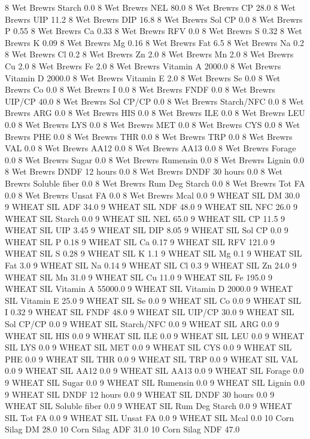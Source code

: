\documentclass[letterpaper,10pt,english]{sphinxmanual}
\begin{document}
\begin{sphinxVerbatim}[commandchars=\\\{\},numbers=left,firstnumber=1,stepnumber=1]
8 Wet Brewrs Starch 0.0
8 Wet Brewrs NEL 80.0
8 Wet Brewrs CP 28.0
8 Wet Brewrs UIP 11.2
8 Wet Brewrs DIP 16.8
8 Wet Brewrs Sol CP 0.0
8 Wet Brewrs P 0.55
8 Wet Brewrs Ca 0.33
8 Wet Brewrs RFV 0.0
8 Wet Brewrs S 0.32
8 Wet Brewrs K 0.09
8 Wet Brewrs Mg 0.16
8 Wet Brewrs Fat 6.5
8 Wet Brewrs Na 0.2
8 Wet Brewrs Cl 0.2
8 Wet Brewrs Zn 2.0
8 Wet Brewrs Mn 2.0
8 Wet Brewrs Cu 2.0
8 Wet Brewrs Fe 2.0
8 Wet Brewrs Vitamin A 2000.0
8 Wet Brewrs Vitamin D 2000.0
8 Wet Brewrs Vitamin E 2.0
8 Wet Brewrs Se 0.0
8 Wet Brewrs Co 0.0
8 Wet Brewrs I 0.0
8 Wet Brewrs FNDF 0.0
8 Wet Brewrs UIP/CP 40.0
8 Wet Brewrs Sol CP/CP 0.0
8 Wet Brewrs Starch/NFC 0.0
8 Wet Brewrs ARG 0.0
8 Wet Brewrs HIS 0.0
8 Wet Brewrs ILE 0.0
8 Wet Brewrs LEU 0.0
8 Wet Brewrs LYS 0.0
8 Wet Brewrs MET 0.0
8 Wet Brewrs CYS 0.0
8 Wet Brewrs PHE 0.0
8 Wet Brewrs THR 0.0
8 Wet Brewrs TRP 0.0
8 Wet Brewrs VAL 0.0
8 Wet Brewrs AA\PYGZsh{}12 0.0
8 Wet Brewrs AA\PYGZsh{}13 0.0
8 Wet Brewrs \PYGZpc{} Forage 0.0
8 Wet Brewrs Sugar \PYGZpc{} 0.0
8 Wet Brewrs Rumensin 0.0
8 Wet Brewrs Lignin 0.0
8 Wet Brewrs DNDF 12 hours 0.0
8 Wet Brewrs DNDF 30 hours 0.0
8 Wet Brewrs Soluble fiber 0.0
8 Wet Brewrs Rum Deg Starch 0.0
8 Wet Brewrs Tot FA 0.0
8 Wet Brewrs Unsat FA 0.0
8 Wet Brewrs Mcal 0.0
9 WHEAT SIL DM 30.0
9 WHEAT SIL ADF 34.0
9 WHEAT SIL NDF 48.0
9 WHEAT SIL NFC 26.0
9 WHEAT SIL Starch 0.0
9 WHEAT SIL NEL 65.0
9 WHEAT SIL CP 11.5
9 WHEAT SIL UIP 3.45
9 WHEAT SIL DIP 8.05
9 WHEAT SIL Sol CP 0.0
9 WHEAT SIL P 0.18
9 WHEAT SIL Ca 0.17
9 WHEAT SIL RFV 121.0
9 WHEAT SIL S 0.28
9 WHEAT SIL K 1.1
9 WHEAT SIL Mg 0.1
9 WHEAT SIL Fat 3.0
9 WHEAT SIL Na 0.14
9 WHEAT SIL Cl 0.3
9 WHEAT SIL Zn 24.0
9 WHEAT SIL Mn 31.0
9 WHEAT SIL Cu 11.0
9 WHEAT SIL Fe 195.0
9 WHEAT SIL Vitamin A 55000.0
9 WHEAT SIL Vitamin D 2000.0
9 WHEAT SIL Vitamin E 25.0
9 WHEAT SIL Se 0.0
9 WHEAT SIL Co 0.0
9 WHEAT SIL I 0.32
9 WHEAT SIL FNDF 48.0
9 WHEAT SIL UIP/CP 30.0
9 WHEAT SIL Sol CP/CP 0.0
9 WHEAT SIL Starch/NFC 0.0
9 WHEAT SIL ARG 0.0
9 WHEAT SIL HIS 0.0
9 WHEAT SIL ILE 0.0
9 WHEAT SIL LEU 0.0
9 WHEAT SIL LYS 0.0
9 WHEAT SIL MET 0.0
9 WHEAT SIL CYS 0.0
9 WHEAT SIL PHE 0.0
9 WHEAT SIL THR 0.0
9 WHEAT SIL TRP 0.0
9 WHEAT SIL VAL 0.0
9 WHEAT SIL AA\PYGZsh{}12 0.0
9 WHEAT SIL AA\PYGZsh{}13 0.0
9 WHEAT SIL \PYGZpc{} Forage 0.0
9 WHEAT SIL Sugar \PYGZpc{} 0.0
9 WHEAT SIL Rumensin 0.0
9 WHEAT SIL Lignin 0.0
9 WHEAT SIL DNDF 12 hours 0.0
9 WHEAT SIL DNDF 30 hours 0.0
9 WHEAT SIL Soluble fiber 0.0
9 WHEAT SIL Rum Deg Starch 0.0
9 WHEAT SIL Tot FA 0.0
9 WHEAT SIL Unsat FA 0.0
9 WHEAT SIL Mcal 0.0
10 Corn Silag DM 28.0
10 Corn Silag ADF 31.0
10 Corn Silag NDF 47.0

\end{sphinxVerbatim}
\end{document}
